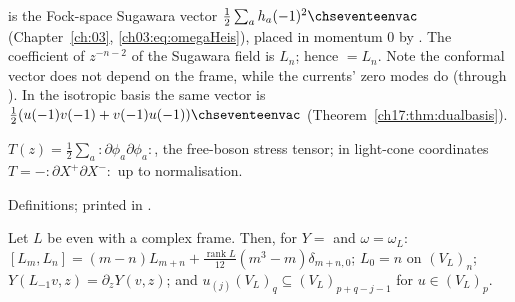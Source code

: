 \begin{dictionary}
 is the Fock-space Sugawara vector $\tfrac12\sum_ah_a(-1)^2\chseventeenvac$ (Chapter~\ref{ch:03},
\eqref{ch03:eq:omegaHeis}), placed in momentum $0$ by .  The coefficient of $z^{-n-2}$ of the
Sugawara field is $L_n$; hence  $=L_n$.  Note the conformal vector does not depend on
the frame, while the currents' zero modes do (through ).  In the isotropic basis the same
vector is $\tfrac12(u(-1)v(-1)+v(-1)u(-1))\chseventeenvac$ (Theorem~\ref{ch17:thm:dualbasis}).
\end{dictionary}

\begin{physics}
$T(z)=\frac12\sum_a{:}\partial\phi_a\partial\phi_a{:}$, the free-boson stress tensor; in light-cone
coordinates $T=-{:}\partial X^+\partial X^-{:}$ up to normalisation.
\end{physics}

\begin{status}
Definitions; printed in .
\end{status}

\begin{theorem}\label{ch17:thm:virasoro}
Let $L$ be even with a complex frame.  Then, for $Y=$  and $\omega=\omega_L$:
$[L_m,L_n]=(m-n)L_{m+n}+\tfrac{\operatorname{rank}L}{12}(m^3-m)\delta_{m+n,0}$; $L_0=n$ on $(V_L)_n$;
$Y(L_{-1}v,z)=\partial_zY(v,z)$; and $u_{(j)}(V_L)_q\subseteq(V_L)_{p+q-j-1}$ for $u\in(V_L)_p$.
\end{theorem}

